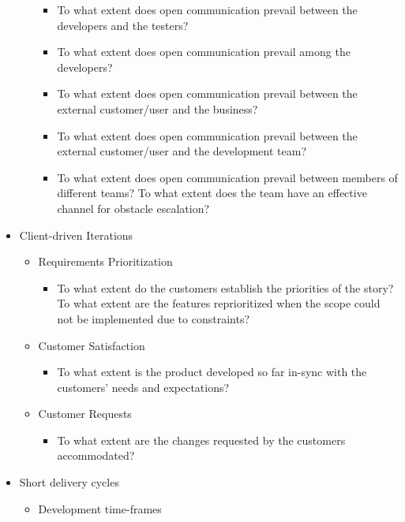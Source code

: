 \begin{appendices}
\begin{itemize}
\begin{itemize}
\begin{itemize}
					\item To what extent does open communication prevail between the developers and the testers? 
					\item To what extent does open communication prevail among the developers? 
					\item To what extent does open communication prevail between the external customer/user and the business? 
					\item To what extent does open communication prevail between the external customer/user and the development team? 
					\item To what extent does open communication prevail between members of different teams?
					\addition To what extent does the team have an effective channel for obstacle escalation?
				\end{itemize}
		\end{itemize}
	\item Client-driven Iterations
		\begin{itemize}
			\item Requirements Prioritization
				\begin{itemize}
					\item To what extent do the customers establish the priorities of the story?
					\addition To what extent are the features reprioritized when the scope could not be implemented due to constraints?
				\end{itemize}
			\item Customer Satisfaction
				\begin{itemize}
					\item To what extent is the product developed so far in-sync with the customers' needs and expectations?
				\end{itemize}
			\item Customer Requests
				\begin{itemize}
					\item To what extent are the changes requested by the customers accommodated?
				\end{itemize}			
		\end{itemize}
	\item Short delivery cycles
		\begin{itemize}
			\item Development time-frames
				\begin{itemize}

\end{itemize}
\end{itemize}
\end{itemize}
\end{appendices}
